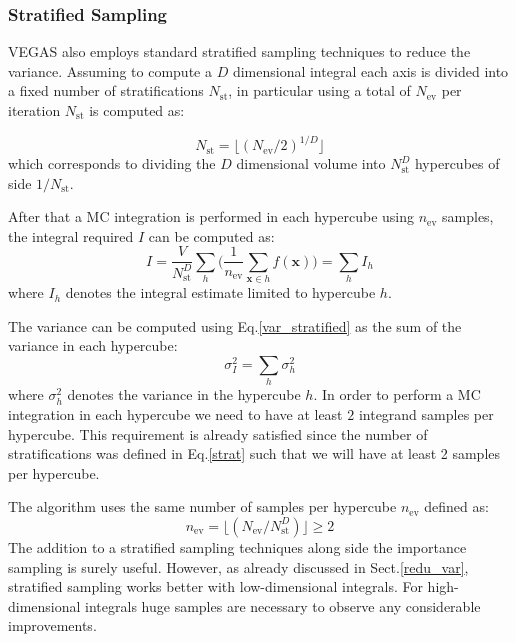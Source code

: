 \documentclass[../main/main.tex]{subfiles}
\begin{document}
\subsubsection{Stratified Sampling}
VEGAS also employs standard stratified sampling techniques to reduce the variance.
Assuming to compute a $D$ dimensional integral each axis is divided into a fixed number of stratifications $N_\text{st}$, in particular using a total of $N_{\text{ev}}$ per iteration $N_\text{st}$ is computed as:

\begin{equation}
	\label{strat}
	N_\text{st} = \lfloor (N_\text{ev}/2)^{1/D}\rfloor
\end{equation}
which corresponds to dividing the $D$ dimensional volume into $N_\text{st}^D$ hypercubes of side $1/N_\text{st}$.

After that a MC integration is performed in each hypercube using $n_\text{ev}$ samples, the integral required $I$ can be computed as:
\begin{equation}
	\label{i str}
	I = \frac{V}{N_\text{st}^D}\sum_h \bigg(\frac{1}{n_\text{ev}} \sum_{\textbf{x} \in h} f(\textbf{x}) \bigg) = \sum_h I_h
\end{equation}
where $I_h$ denotes the integral estimate limited to hypercube $h$.

The variance can be computed using Eq.\eqref{var_stratified} as the sum of the variance in each hypercube:
\begin{equation}
	\label{sigma str}
	\sigma^2_I = \sum_h \sigma^2_h
\end{equation}
where $\sigma^2_h$ denotes the variance in the hypercube $h$.
In order to perform a MC integration in each hypercube we need to have at least $2$ integrand samples per hypercube. This requirement is already satisfied since the number of stratifications was defined in Eq.\eqref{strat} such that we will have at least 2 samples per hypercube. 

The algorithm uses the same number of samples per hypercube $n_\text{ev}$ defined as:
\begin{equation}
	n_\text{ev} = \lfloor (N_\text{ev}/N_\text{st}^D)\rfloor \ge 2
\end{equation} 
The addition to a stratified sampling techniques along side the importance sampling is surely useful.
However, as already discussed in Sect.\ref{redu_var}, stratified sampling works better with low-dimensional integrals. For 
high-dimensional integrals huge samples are necessary to observe any considerable improvements.
\end{document}

